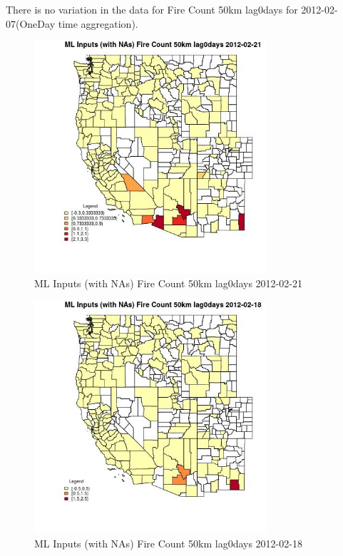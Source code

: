 There is no variation in the data for Fire Count 50km lag0days for 2012-02-07(OneDay time aggregation). 
 

\begin{figure} 
\centering  
\includegraphics[width=0.77\textwidth]{Code_Outputs/Report_ML_input_PM25_Step4_part_f_de_duplicated_aveswNAs_CountyFire_Count_50km_lag0daysMean2012-02-21.jpg} 
\caption{\label{fig:Report_ML_input_PM25_Step4_part_f_de_duplicated_aveswNAsCountyFire_Count_50km_lag0daysMean2012-02-21}ML Inputs (with NAs) Fire Count 50km lag0days 2012-02-21} 
\end{figure} 
 

\begin{figure} 
\centering  
\includegraphics[width=0.77\textwidth]{Code_Outputs/Report_ML_input_PM25_Step4_part_f_de_duplicated_aveswNAs_CountyFire_Count_50km_lag0daysMean2012-02-18.jpg} 
\caption{\label{fig:Report_ML_input_PM25_Step4_part_f_de_duplicated_aveswNAsCountyFire_Count_50km_lag0daysMean2012-02-18}ML Inputs (with NAs) Fire Count 50km lag0days 2012-02-18} 
\end{figure} 
 

